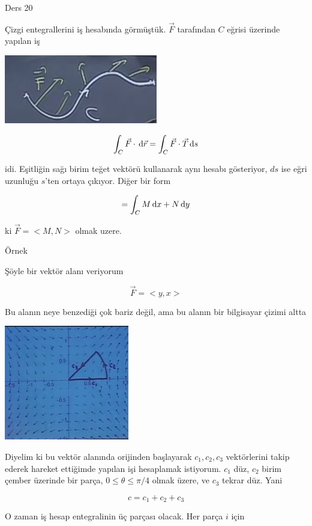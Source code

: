 \documentclass[12pt,fleqn]{article}\usepackage{../../common}
\begin{document}
Ders 20

Çizgi entegrallerini iş hesabında görmüştük. $\vec{F}$ tarafından $C$
eğrisi üzerinde yapılan iş

\begin{center}
\includegraphics[height=3cm]{20_1.png}
\end{center}

$$ \int_C \vec{F} \cdot \,\mathrm{d}\vec{r} =  \int_C \vec{F} \cdot \vec{T} \,\mathrm{d} s $$

idi. Eşitliğin sağı birim teğet vektörü kullanarak aynı hesabı gösteriyor, $ds$
ise eğri uzunluğu $s$'ten ortaya çıkıyor. Diğer bir form

$$ = \int_C M \,\mathrm{d} x + N \,\mathrm{d} y $$

ki $\vec{F} = < M,N >$ olmak uzere. 

Örnek 

Şöyle bir vektör alanı veriyorum

$$ \vec{F} = < y,x > $$

Bu alanın neye benzediği çok bariz değil, ama bu alanın bir bilgisayar
çizimi altta

\begin{center}
\includegraphics[height=5cm]{20_2.png}
\end{center}

Diyelim ki bu vektör alanında orijinden başlayarak $c_1,c_2,c_3$ vektörlerini
takip ederek hareket ettiğimde yapılan işi hesaplamak istiyorum. $c_1$ düz,
$c_2$ birim çember üzerinde bir parça, $0 \le \theta \le \pi / 4$ olmak üzere,
ve $c_3$ tekrar düz. Yani

$$ c = c_1 + c_2 + c_3 $$

O zaman iş hesap entegralinin üç parçası olacak. Her parça $i$ için 
\end{document}
